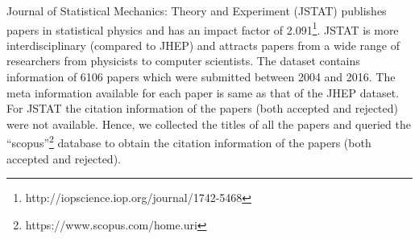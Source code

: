 Journal of Statistical Mechanics: Theory and Experiment (JSTAT) publishes papers in statistical physics and has 
an impact factor of 2.091\footnote{http://iopscience.iop.org/journal/1742-5468}. 
JSTAT is more interdisciplinary (compared to JHEP) and attracts papers from a wide range of researchers from physicists to computer scientists. 
The dataset contains information of 6106 papers which were submitted between 2004 and 2016. The meta information available for each paper is same as that of the 
JHEP dataset.
For JSTAT the citation information of the papers (both accepted and rejected) were not available. Hence, we collected the titles of all the papers and queried the ``scopus''\footnote{https://www.scopus.com/home.uri}
database to obtain the citation information of the papers (both accepted and rejected).











